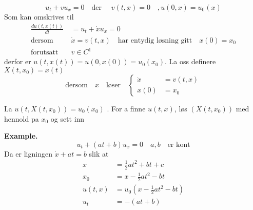 \documentclass{article}
\theoremstyle{remark}
\begin{document}
  \[
  u_{t} + v u_{x} =0 \quad  \text{der } \quad  v\left( t,x \right) = 0 \quad  , u\left( 0,x \right) = u_{0} \left( x \right)   
  \] 
  Som kan omskrives til \[
    \begin{split}
  \frac{d u\left( t,x\left( t \right) \right)}{d t} &= u_{t} + \dot{x} u_{x} = 0  \\
  \text{dersom} \quad  & \dot{x} = v\left( t,x \right) \quad \text{har entydig løsning gitt}\quad x\left( 0 \right) = x_{0} \\
  \text{forutsatt} \quad   &  v \in C^{1} 
    \end{split}
  \] 
  derfor er $u\left( t, x\left( t \right) \right) = u\left( 0, x\left( 0 \right) \right) = u_{0} \left( x_{0} \right)$. La oss definere $X\left( t, x_{0} \right) = x\left( t \right)$ \[
  \text{dersom} \quad  x \quad \text{løser} \quad \begin{cases}
    \dot{x} &= v\left( t,x \right) \\
    x\left( 0 \right) &= x_{0}  
  \end{cases}  
  \] 

  La $u\left( t, X\left( t,x_{0} \right) \right) = u_{0} \left( x_{0} \right)$ . For a finne $u\left( t,x \right)$, løs $\left( X\left( t,x_{0} \right) \right)$ med hennold 
  pa $x_{0} $ og sett inn  

  \textbf{Example.} 
    \[
    u_{t} + \left( at +b \right)u_{x} = 0  \quad  a,b \quad \text{er kont}  
    \]
    Da er ligningen $\dot{x} + at = b$ slik at \[
    \begin{split}
      x &=  \frac{1}{2} at^2  + bt  +c\\
      x_{0} &=  x - \frac{1}{2  } at^2 - bt \\
      u\left( t,x \right) &= u_{0} \left( x-\frac{1}{2} at^2 -bt \right)\\
      u_{t} &= -\left( at +b \right)
    \end{split}
    \] 



 \newpage


\end{document}
